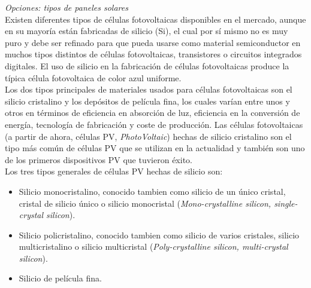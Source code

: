 \documentclass[12pt]{article}
\begin{document}
	\pagebreak
	
	
	
	
	\noindent \textit{Opciones: tipos de paneles solares}\\
	
	\noindent Existen diferentes tipos de células fotovoltaicas disponibles en el mercado, aunque en su mayoría están fabricadas de silicio (Si), el cual por sí mismo no es muy puro y debe ser refinado para que pueda usarse como material semiconductor en muchos tipos distintos de células fotovoltaicas, transistores o circuitos integrados digitales. El uso de silicio en la fabricación de células fotovoltaicas produce la típica célula fotovoltaica de color azul uniforme. \\
	\noindent Los dos tipos principales de materiales usados para células fotovoltaicas son el silicio cristalino y los depósitos de película fina, los cuales varían entre unos y otros en términos de eficiencia en absorción de luz, eficiencia en la conversión de energía, tecnología de fabricación y coste de producción. Las células fotovoltaicas (a partir de ahora, células PV, \textit{PhotoVoltaic}) hechas de silicio cristalino son el tipo más común de células PV que se utilizan en la actualidad y también son uno de los primeros dispositivos PV que tuvieron éxito.\\
	
	\noindent Los tres tipos generales de células PV hechas de silicio son:
	
	\begin{itemize}
		\item Silicio monocristalino, conocido tambien como silicio de un único cristal, cristal de silicio único o silicio monocristal (\textit{Mono-crystalline silicon, single-crystal silicon}).
		\item Silicio policristalino, conocido tambien como silicio de varios cristales, silicio multicristalino o silicio multicristal (\textit{Poly-crystalline silicon, multi-crystal silicon}).
		\item Silicio de película fina. \\
	\end{itemize}
\end{document}
